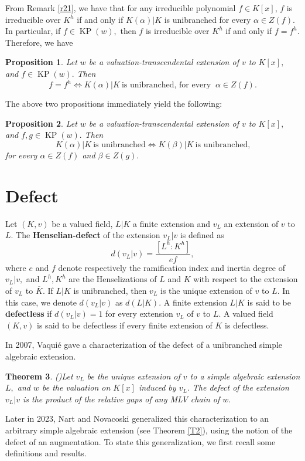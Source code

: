 \documentclass[11pt]{amsart}
\newtheorem{theorem}{Theorem}[section]
\newtheorem{proposition}[theorem]{Proposition}
\theoremstyle{definition}
\theoremstyle{remark}
\numberwithin{equation}{section}
\begin{document}
From Remark \ref{r21}, we have that for any irreducible polynomial $f\in K[x]$, $f$ is irreducible over $K^h$ if and only if $K(\alpha)|K$ is unibranched for every $\alpha\in Z(f).$ In particular, if $f\in \operatorname{KP}(w),$ then $f$ is irreducible over $K^h$ if and only if $f=f^h.$ Therefore, we have 
\begin{proposition}\label{bp1}
	Let $w$ be a valuation-transcendental extension of $v$ to $K[x],$ and $f \in \operatorname{KP}(w).$ Then\[f=f^h \iff K(\alpha)|K \ \text{is unibranched, for every } \ \alpha\in Z(f).\]
\end{proposition}
The above two propositions immediately yield the following:
\begin{proposition}\label{bp2}
	Let $w$ be a valuation-transcendental extension of $v$ to $K[x],$ and $f , g\in \operatorname{KP}(w).$ Then
	\[K(\alpha)|K \ \text{is unibranched} \iff K(\beta)|K \ \text{is unibranched,} \] for every $\alpha\in Z(f)$ and  $\beta \in Z(g).$
	\end{proposition}


	\section{Defect}

	Let $(K,v)$ be a valued field, $L|K$ a finite extension and $v_L$ an extension of $v$ to $L.$ The {\bf Henselian-defect} of the extension $v_L|v$ is defined as \[d(v_L|v)=\frac{[L^h:K^h]}{ef},\] where $e$ and $f$ denote respectively the ramification index and inertia degree of $v_L|v,$  and $L^h, K^h$ are the Henselizations of $L$ and $K$  with respect to the extension of $v_L$ to $\overline{K}.$  If $L|K$ is unibranched, then $v_L$ is the unique extension of $v$ to $L.$ In this case, we denote $d(v_L|v)$ as $d(L|K).$ A finite extension $L|K$ is said to be {\bf defectless} if $d(v_L|v)=1$ for every extension $v_L$ of $v$ to $L.$ A valued field $(K,v)$ is said to be defectless if every finite extension of $K$ is defectless.
	
	In 2007, Vaqui\'e gave a characterization of the defect of a unibranched simple algebraic extension.
	\begin{theorem}(\cite[Corollary 2.10]{V2})\label{vth1}
		Let $v_L$ be the unique extension of $v$ to a simple algebraic extension $L,$ and $w$ be the valuation on $K[x]$ induced by $v_L.$ The defect of the extension $v_L|v$ is the product of the relative gaps of any MLV chain of $w.$
	\end{theorem}
	Later in 2023, Nart and Novacoski generalized this characterization to an arbitrary simple algebraic extension (see Theorem \ref{T2}), using the notion of the defect of an augmentation. To state this generalization, we first recall some definitions and results.
	
\end{document}
